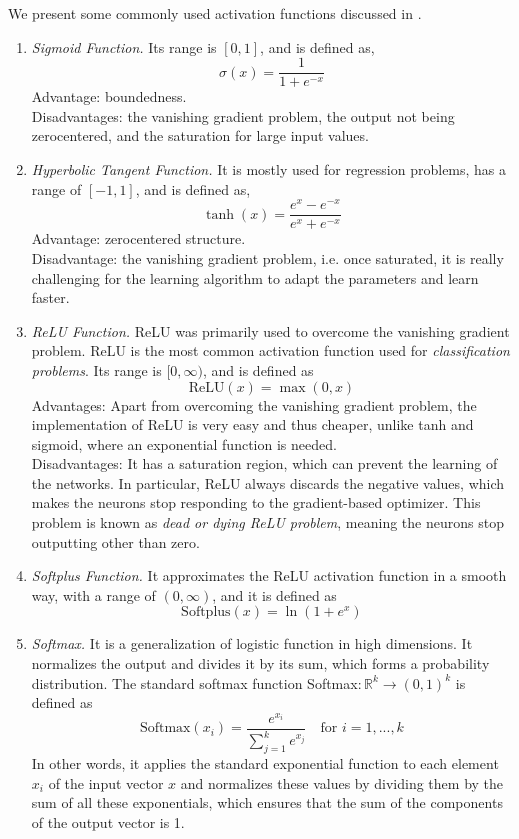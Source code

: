 \documentclass{article}
\begin{document}
We present some commonly used activation functions discussed in \cite{jagtap2022important}.
\begin{enumerate}
  \item \textit{Sigmoid Function.} Its range is $[0,1]$, and is defined as,
$$\sigma(x) = \frac{1}{1 + e^{-x}}$$
Advantage: boundedness. \\ Disadvantages:
the vanishing gradient problem, the output not being zerocentered, and the saturation for large input values. 
  \item \textit{Hyperbolic Tangent Function.} It is mostly used for
regression problems, has a range of $[-1,1]$, and is defined as,
$$\tanh(x) = \frac{e^{x} - e^{-x}}{e^{x} + e^{-x}}$$
Advantage: zerocentered structure. \\
Disadvantage: the vanishing gradient problem, i.e. once saturated, it is really challenging
for the learning algorithm to adapt the parameters and learn
faster.
  \item \textit{ReLU Function.} ReLU was primarily used to overcome the vanishing gradient problem. ReLU is the most common activation function used for \textit{classification problems}. Its range is $[0, \infty)$, and is defined as
  $$\text{ReLU}(x) = \max(0, x)$$
Advantages: Apart from overcoming the vanishing gradient problem, the
implementation of ReLU is very easy and thus cheaper, unlike
tanh and sigmoid, where an exponential function is needed.
\\
Disadvantages: It has a saturation region, which can prevent the
learning of the networks. In particular, ReLU always discards
the negative values, which makes the neurons stop responding to
the gradient-based optimizer. This problem is known as \textit{dead
or dying ReLU problem}, meaning the neurons stop
outputting other than zero. 
  \item \textit{Softplus Function.} It approximates the ReLU activation function in a smooth way, with a range of $(0, \infty)$, and it is defined as
$$\text{Softplus}(x) = \ln (1+ e^x) $$
  \item \textit{Softmax.} It is a generalization of logistic
function in high dimensions. It normalizes the output and
divides it by its sum, which forms a probability distribution. The standard softmax function Softmax$: \mathbb{R}^k \to (0,1)^k$ is defined as 
$$\text{Softmax}(x_i) = \frac{e^{x_i}}{\sum^{k}_{j=1} e^{x_j}} \quad \text{for } i= 1,...,k   $$
In other words, it applies
the standard exponential function to each element $x_i$
of the input vector $x$ and normalizes these values by
dividing them by the sum of all these exponentials, which ensures that the sum of the components of the output vector is 1.
\end{enumerate}
\end{document}
